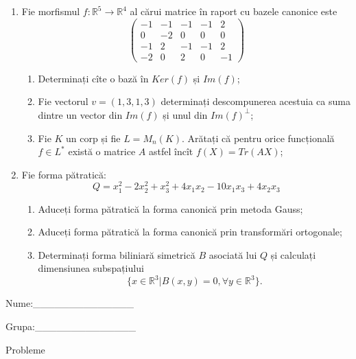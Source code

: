 \documentclass{article}
\begin{document}
\begin{enumerate}
 \item Fie morfismul $f:\mathbb{R}^5 \to \mathbb{R}^4$ al cărui matrice în raport cu bazele canonice este
$$\begin{pmatrix}
-1&-1&-1&-1&2\\
0&-2&0&0&0\\
-1&2&-1&-1&2\\
-2&0&2&0&-1
\end{pmatrix}$$

\begin{enumerate}
\item Determinați cîte o bază în $Ker(f)$ și $Im(f)$;
\item Fie vectorul $v=(1,3,1,3)$ determinați descompunerea acestuia ca suma dintre un vector din $Im(f)$ și unul din $Im(f)^\perp$;
\item Fie $K$ un corp și fie $L=M_n(K)$. Arătați că pentru orice funcțională $f \in L^*$ există o matrice $A$ astfel încît $f(X)=Tr(AX)$;
\end{enumerate}
\item Fie forma pătratică:
$$Q= x_1^2-2x_2^2+x_3^2+4x_1x_2-10x_1x_3+4x_2x_3$$

\begin{enumerate}
\item Aduceți forma pătratică la forma canonică prin metoda Gauss;
\item Aduceți forma pătratică la forma canonică prin transformări ortogonale;
\item Determinați forma biliniară simetrică $B$ asociată lui $Q$ și calculați dimensiunea subspațiului
$$\{x \in \mathbb{R}^3 | B(x,y)=0,\forall y \in \mathbb{R}^3\}.$$

\end{enumerate}
\end{enumerate}
\newpage
\begin{flushright}
Nume:\_\_\_\_\_\_\_\_\_\_\_\_\_\_
 
 
Grupa:\_\_\_\_\_\_\_\_\_\_\_\_\_\_
\end{flushright}
\begin{center}
\vspace{2cm}
{\Large Probleme}
\vspace{2cm}
\end{center}
\end{document}
